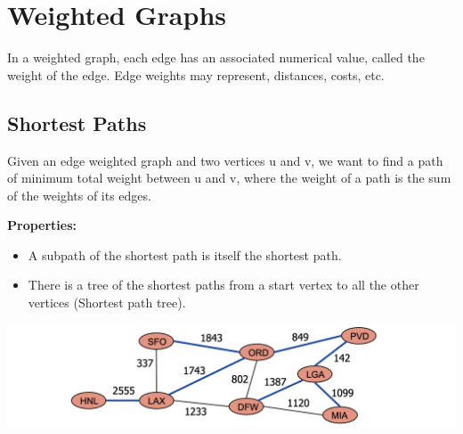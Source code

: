 \documentclass[12pt]{article}
\newcommand{\1}{\space \quad}
\newcommand{\2}{\quad \quad \quad}
\newcommand{\3}{\quad \quad \quad \quad \space}
\newcommand{\4}{\quad \quad \quad \quad \quad \quad}
\newcommand{\5}{\quad \quad \quad \quad \quad \quad \quad \space}
\begin{document}
\section{Weighted Graphs}
In a weighted graph, each edge has an associated numerical value, called the weight of the edge.
Edge weights may represent, distances, costs, etc.

\subsection{Shortest Paths}
Given an edge weighted graph and two vertices u and v, we want to find a path of minimum total weight between u and v, 
where the weight of a path is the sum of the weights of its edges.

\vspace{10pt}
\textbf{Properties:}
\begin{itemize}
  \item A subpath of the shortest path is itself the shortest path.
  \item There is a tree of the shortest paths from a start vertex to all the other vertices (Shortest path tree).
\end{itemize}
\includegraphics[width=\textwidth]{image18.png}

\end{document}
